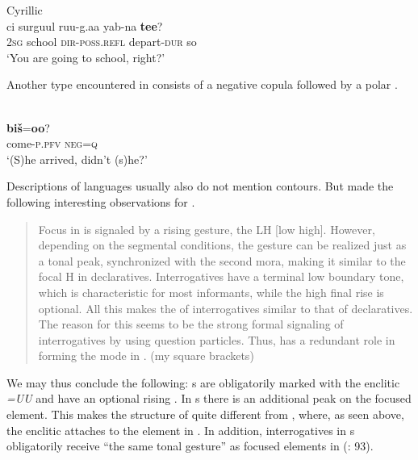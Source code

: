 \ea%
    \label{ex:mong:21}
    Cyrillic  \\
    \gll ci  surguul  ruu-g.aa  yab-na \textbf{{tee}}?\\
    2\textsc{sg}  school    \textsc{dir}-\textsc{poss}.\textsc{refl}  depart-\textsc{dur}  so\\
    \glt ‘You are going to school, right?’
    \z

Another  type encountered in  consists of a negative copula followed by a polar .

\ea%
    \label{ex:mong:22}
     \\
     \textbf{{biš}}=\textbf{{oo}}?\\
    come-\textsc{p.pfv}  \textsc{neg}=\textsc{q}\\
    \glt ‘(S)he arrived, didn’t (s)he?’ \citep[188]{Ragagnin2011}
    \z

Descriptions of  languages usually also do not mention  contours. But \citet[192]{Karlsson2003} made the following interesting observations for  .

\begin{quote}
Focus in  is signaled by a rising gesture, the LH [low high]. However, depending on the segmental conditions, the gesture can be realized just as a tonal peak, synchronized with the second mora, making it similar to the focal H in declaratives. Interrogatives have a terminal low boundary tone, which is characteristic for most informants, while the high final rise is optional. All this makes the  of interrogatives similar to that of declaratives. The reason for this seems to be the strong formal signaling of interrogatives by using question particles. Thus,  has a redundant role in forming the  mode in . (my square brackets)
\end{quote}

\noindent We may thus conclude the following: s are obligatorily marked with the enclitic \textit{=UU} and have an optional rising . In s there is an additional peak on the focused element. This makes the structure of   quite different from , where, as seen above, the enclitic attaches to the element in . In addition, interrogatives in s obligatorily receive “the same tonal gesture” as focused elements in   (\citealt{Svantesson2005}: 93).

